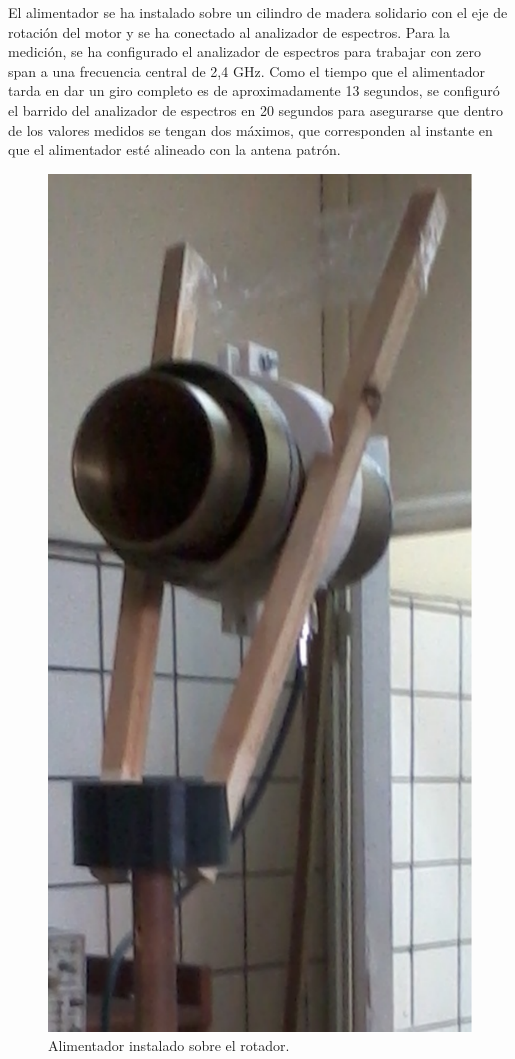 El alimentador se ha instalado sobre un cilindro de madera solidario con el eje de rotación del motor y se ha conectado al analizador de espectros. Para la medición, se ha configurado el analizador de espectros para trabajar con zero span a una frecuencia central de 2,4 GHz. Como el tiempo que el alimentador tarda en dar un giro completo es de aproximadamente 13 segundos, se configuró el barrido del analizador de espectros en 20 segundos para asegurarse que dentro de los valores medidos se tengan dos máximos, que corresponden al instante en que el alimentador esté alineado con la antena patrón.
\begin{figure}[H]
\centering
\includegraphics[scale = 0.35]{Figures/Resultados/resultados_19}
\caption{Alimentador instalado sobre el rotador.}
\label{fig_resultados:19}
\end{figure}
